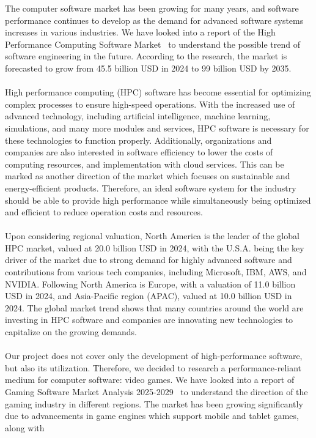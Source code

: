 The computer software market has been growing for many years, and software performance continues to develop 
as the demand for advanced software systems increases in various industries.
We have looked into a report of the High Performance Computing Software Market~\cite{Market Research Future} to 
understand the possible trend of software engineering in the future.
According to the research, the market is forecasted to grow from 45.5 billion USD in 2024 to 99 billion USD by 2035.
\\\\
High performance computing (HPC) software has become essential for optimizing complex processes to ensure high-speed operations.
With the increased use of advanced technology, including artificial intelligence, machine learning, simulations, and many more 
modules and services, HPC software is necessary for these technologies to function properly.
Additionally, organizations and companies are also interested in software efficiency to lower the costs of computing resources, 
and implementation with cloud services.
This can be marked as another direction of the market which focuses on sustainable and energy-efficient products.
Therefore, an ideal software system for the industry should be able to provide high performance while simultaneously being 
optimized and efficient to reduce operation costs and resources.
\\\\
Upon considering regional valuation, North America is the leader of the global HPC market, valued at 20.0 billion USD in 2024, 
with the U.S.A. being the key driver of the market due to strong demand for highly advanced software and contributions from 
various tech companies, including Microsoft, IBM, AWS, and NVIDIA.
Following North America is Europe, with a valuation of 11.0 billion USD in 2024, and Asia-Pacific region (APAC), valued at 
10.0 billion USD in 2024.
The global market trend shows that many countries around the world are investing in HPC software and companies are innovating 
new technologies to capitalize on the growing demands.
\\\\
Our project does not cover only the development of high-performance software, but also its utilization.
Therefore, we decided to research a performance-reliant medium for computer software: video games.
We have looked into a report of Gaming Software Market Analysis 2025-2029~\cite{Technavio} to understand the direction of 
the gaming industry in different regions.
The market has been growing significantly due to advancements in game engines which support mobile and tablet games, along with 
